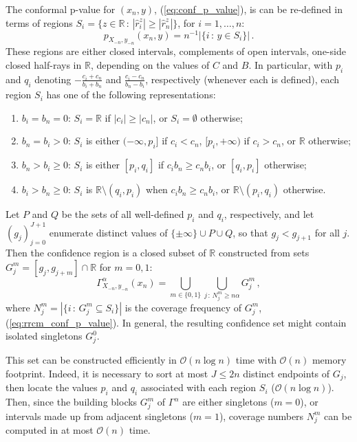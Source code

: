 \documentclass[10pt, conference, compsocconf]{IEEEtran}
\newcommand{\BigO}{\mathcal{O}}
\newcommand{\Real}{\mathbb{R}}
\begin{document}
The conformal p-value for $(x_n, y)$, (\ref{eq:conf_p_value}), is can be re-defined
in terms of regions $S_i = \{z\in\Real\,:\, |\hat{r}_i^z| \geq |\hat{r}_n^z|\}$,
for $i=1,\ldots, n$:
\begin{equation} \label{eq:rrcm_conf_p_value}
  p_{X_{-n}, y_{-n}}(x_n, y) = n^{-1} \bigl\lvert\{ i \,:\, y \in S_i \}\bigr\rvert \,.
\end{equation}
These regions are either closed intervals, complements of open intervals, one-side
closed half-rays in $\Real$, depending on the values of $C$ and $B$. In particular,
with $p_i$ and $q_i$ denoting $-\frac{c_i+c_n}{b_i+b_n}$ and $\frac{c_i-c_n}{b_n-b_i}$,
respectively (whenever each is defined), each region $S_i$ has one of the following
representations:
\begin{enumerate}
  \item $b_i=b_n=0$: $S_i = \Real$ if $|c_i| \geq |c_n|$, or $S_i = \emptyset$
  otherwise;
  \item $b_n = b_i > 0$: $S_i$ is either $(-\infty, p_i]$ if $c_i < c_n$, $[p_i, +\infty)$ if
  $c_i > c_n$, or $\Real$ otherwise;
  \item $b_n > b_i \geq 0$: $S_i$ is either $[p_i, q_i]$ if $c_i b_n \geq c_n b_i$,
  or $[q_i, p_i]$ otherwise;
  \item $b_i > b_n \geq 0$: $S_i$ is $\Real\setminus (q_i, p_i)$ when $c_i b_n \geq c_n b_i$,
  or $\Real\setminus (p_i, q_i)$ otherwise.
\end{enumerate}
Let $P$ and $Q$ be the sets of all well-defined $p_i$ and $q_i$, respectively, and
let $(g_j)_{j=0}^{J+1}$ enumerate distinct values of $\{\pm\infty\} \cup P \cup Q$,
so that $g_j < g_{j+1}$ for all $j$. Then the confidence region is a closed subset
of $\Real$ constructed from sets $G^m_j = [g_j, g_{j+m}]\cap \Real$ for $m=0, 1$:
\begin{equation} \label{eq:rrcm_conf_ci}
  \Gamma_{X_{-n}, y_{-n}}^\alpha(x_n)
    = \bigcup_{m\in\{0,1\}} \bigcup_{j\,:\, N^m_j \geq n \alpha} G^m_j
    \,,
\end{equation}
where $N^m_j = |\{i \,:\, G^m_j \subseteq S_i\}|$ is the coverage frequency of $G^m_j$,
(\ref{eq:rrcm_conf_p_value}). In general, the resulting confidence set might contain
isolated singletons $G^0_j$.

This set can be constructed efficiently in $\BigO(n \log{} n)$ time with $\BigO(n)$
memory footprint. Indeed, it is necessary to sort at most $J\leq 2n$ distinct endpoints
of $G_j$, then locate the values $p_i$ and $q_i$ associated with each region $S_i$
($\BigO(n \log{} n)$). Then, since the building blocks $G^m_j$ of $\Gamma^\alpha$
are either singletons ($m=0$), or intervals made up from adjacent singletons ($m=1$),
coverage numbers $N^m_j$ can be computed in at most $\BigO(n)$ time.
\end{document}
